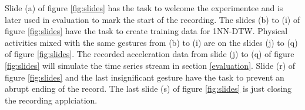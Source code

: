 Slide (a) of figure \ref{fig:slides} has the task to welcome the experimentee and is later used in evaluation to mark
the start of the recording. The slides (b) to (i) of figure \ref{fig:slides} have the task to create training data for
1NN-DTW. Physical activities mixed with the same gestures from (b) to (i) are on the slides (j) to (q) of figure
\ref{fig:slides}. The recorded acceleration data from slide (j) to (q) of figure \ref{fig:slides} will simulate the time
series stream in section \ref{evaluation}. Slide (r) of figure \ref{fig:slides} and the last insignificant gesture have
the task to prevent an abrupt ending of the record. The last slide (s) of figure \ref{fig:slides} is just closing the
recording applciation.



